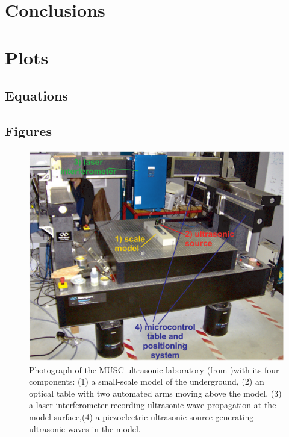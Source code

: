 \documentclass[manuscript,revised]{geophysics}
\begin{document}

\section{Conclusions}


\section{Plots}

\subsection*{Equations}

\subsection*{Figures}

\begin{figure}[!h]
	\centering
	\includegraphics[scale=0.5]{fig/panel_musc_bench.eps}
	\caption{Photograph of the MUSC ultrasonic laboratory (from \citet{Bretaudeau_FWI_2013} )with its four components: (1) a small-scale model of the underground, (2) an optical table with two automated arms moving above the model, (3) a laser interferometer recording ultrasonic wave propagation	at the model surface,(4) a piezoelectric ultrasonic source generating ultrasonic waves in the model.}
	\label{panel_musc_bench}
\end{figure}
\end{document}

